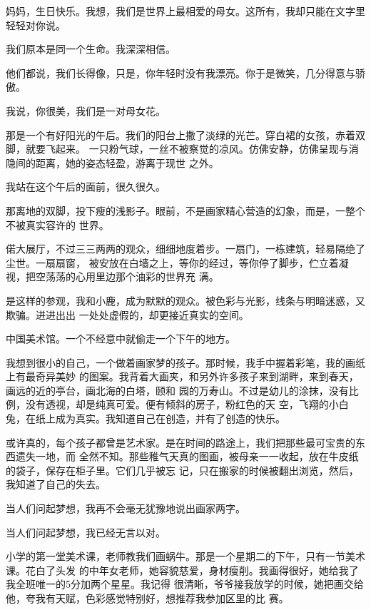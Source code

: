 		妈妈，生日快乐。我想，我们是世界上最相爱的母女。这所有，我却只能在文字里轻轻对你说。

		我们原本是同一个生命。我深深相信。


		他们都说，我们长得像，只是，你年轻时没有我漂亮。你于是微笑，几分得意与骄傲。

		我说，你很美，我们是一对母女花。

	\endwriting



		那是一个有好阳光的午后。我们的阳台上撒了淡绿的光芒。穿白裙的女孩，赤着双脚，就要飞起来。
	一只粉气球，一丝不被察觉的凉风。仿佛安静，仿佛呈现与消隐间的距离，她的姿态轻盈，游离于现世
	之外。

		我站在这个午后的面前，很久很久。

		那离地的双脚，投下瘦的浅影子。眼前，不是画家精心营造的幻象，而是，一整个不被真实容许的
	世界。

		偌大展厅，不过三三两两的观众，细细地度着步。一扇门，一栋建筑，轻易隔绝了尘世。一扇扇窗，
	被安放在白墙之上，等你的经过，等你停了脚步，伫立着凝视，把空荡荡的心用里边那个油彩的世界充
	满。

		是这样的参观，我和小鹿，成为默默的观众。被色彩与光影，线条与明暗迷惑，又欺骗。进进出出
	一处处虚假的，却更接近真实的空间。

		中国美术馆。一个不经意中就偷走一个下午的地方。

		我想到很小的自己，一个做着画家梦的孩子。那时候，我手中握着彩笔，我的画纸上有最奇异美妙
	的图案。我背着大画夹，和另外许多孩子来到湖畔，来到春天，画远的近的亭台，画北海的白塔，颐和
	园的万寿山。不过是幼儿的涂抹，没有比例，没有透视，却是纯真可爱。便有倾斜的房子，粉红色的天
	空，飞翔的小白兔，在纸上成为真实。我知道自己在创造，并有了创造的快乐。

		或许真的，每个孩子都曾是艺术家。是在时间的路途上，我们把那些最可宝贵的东西遗失一地，而
	全然不知。那些稚气天真的图画，被母亲一一收起，放在牛皮纸的袋子，保存在柜子里。它们几乎被忘
	记，只在搬家的时候被翻出浏览，然后，我知道了自己的失去。

		当人们问起梦想，我再不会毫无犹豫地说出画家两字。

		当人们问起梦想，我已经无言以对。

		小学的第一堂美术课，老师教我们画蜗牛。那是一个星期二的下午，只有一节美术课。花白了头发
	的中年女老师，她容貌慈爱，身材瘦削。我画得很好，她给我了我全班唯一的5分加两个星星。我记得
	很清晰，爷爷接我放学的时候，她把画交给他，夸我有天赋，色彩感觉特别好，想推荐我参加区里的比
	赛。


